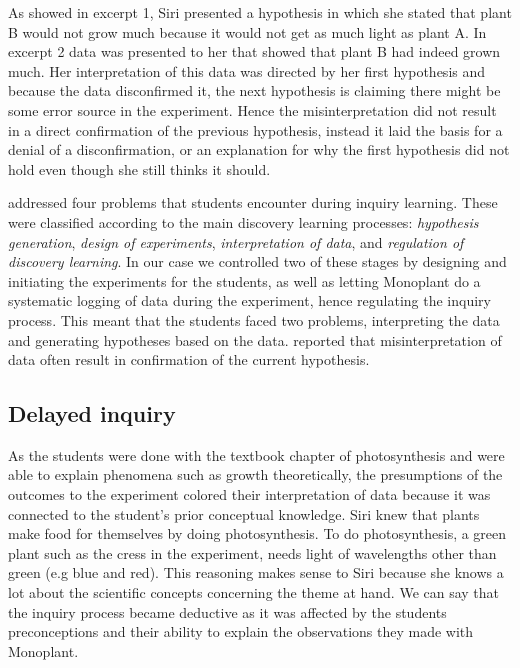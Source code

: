 As showed in excerpt 1, Siri presented a hypothesis in which she stated that plant B would not grow much because it would not get as much light as plant A. In excerpt 2 data was presented to her that showed that plant B had indeed grown much. Her interpretation of this data was directed by her first hypothesis and because the data disconfirmed it, the next hypothesis is claiming there might be some error source in the experiment. Hence the misinterpretation did not result in a direct confirmation of the previous hypothesis, instead it laid the basis for a denial of a disconfirmation, or an explanation for why the first hypothesis did not hold even though she still thinks it should.

\citet{de1998scientific} addressed four problems that students encounter during inquiry learning. These were classified according to the main discovery learning processes: \textit{hypothesis generation}, \textit{design of experiments}, \textit{interpretation of data}, and \textit{regulation of discovery learning}. In our case we controlled two of these stages by designing and initiating the experiments for the students, as well as letting Monoplant do a systematic logging of data during the experiment, hence regulating the inquiry process. This meant that the students faced two problems, interpreting the data and generating hypotheses based on the data. \citeauthor*{klahr1993heuristics} \citetext{\citeyear{klahr1993heuristics}, referenced in \citealp{de1998scientific}} reported that misinterpretation of data often result in confirmation of the current hypothesis. 


\subsection{Delayed inquiry}
As the students were done with the textbook chapter of photosynthesis and were able to explain  phenomena such as growth theoretically, the presumptions of the outcomes to the experiment colored their interpretation of data because it was connected to the student's prior conceptual knowledge. Siri knew that plants make food for themselves by doing photosynthesis. To do photosynthesis, a green plant such as the cress in the experiment, needs light of wavelengths other than green (e.g blue and red). This reasoning makes sense to Siri because she knows a lot about the scientific concepts concerning the theme at hand. We can say that the inquiry process became deductive as it was affected by the students preconceptions and their ability to explain the observations they made with Monoplant. 

